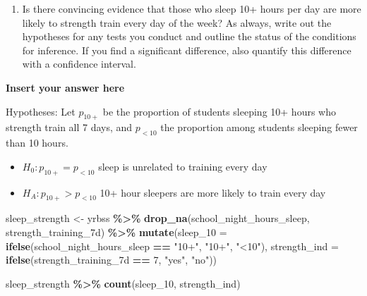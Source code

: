 \documentclass[
]{article}
\newenvironment{Shaded}{\begin{snugshade}}{\end{snugshade}}
\newcommand{\AttributeTok}[1]{\textcolor[rgb]{0.13,0.29,0.53}{#1}}
\newcommand{\DecValTok}[1]{\textcolor[rgb]{0.00,0.00,0.81}{#1}}
\newcommand{\FunctionTok}[1]{\textcolor[rgb]{0.13,0.29,0.53}{\textbf{#1}}}
\newcommand{\NormalTok}[1]{#1}
\newcommand{\OtherTok}[1]{\textcolor[rgb]{0.56,0.35,0.01}{#1}}
\newcommand{\SpecialCharTok}[1]{\textcolor[rgb]{0.81,0.36,0.00}{\textbf{#1}}}
\newcommand{\StringTok}[1]{\textcolor[rgb]{0.31,0.60,0.02}{#1}}
\providecommand{\tightlist}{%
  \setlength{\itemsep}{0pt}\setlength{\parskip}{0pt}}
\begin{document}
\begin{enumerate}
\def\labelenumi{\arabic{enumi}.}
\setcounter{enumi}{8}
\tightlist
\item
  Is there convincing evidence that those who sleep 10+ hours per day
  are more likely to strength train every day of the week? As always,
  write out the hypotheses for any tests you conduct and outline the
  status of the conditions for inference. If you find a significant
  difference, also quantify this difference with a confidence interval.
\end{enumerate}

\textbf{Insert your answer here}

Hypotheses: Let \(p_{10+}\) be the proportion of students sleeping 10+
hours who strength train all 7 days, and \(p_{<10}\) the proportion
among students sleeping fewer than 10 hours.

\begin{itemize}
\tightlist
\item
  \(H_0: p_{10+} = p_{<10}\) sleep is unrelated to training every day
\item
  \(H_A: p_{10+} > p_{<10}\) 10+ hour sleepers are more likely to train
  every day
\end{itemize}

\begin{Shaded}
\begin{Highlighting}[]
\NormalTok{sleep\_strength }\OtherTok{\textless{}{-}}\NormalTok{ yrbss }\SpecialCharTok{\%\textgreater{}\%}
  \FunctionTok{drop\_na}\NormalTok{(school\_night\_hours\_sleep, strength\_training\_7d) }\SpecialCharTok{\%\textgreater{}\%}
  \FunctionTok{mutate}\NormalTok{(}\AttributeTok{sleep\_10 =} \FunctionTok{ifelse}\NormalTok{(school\_night\_hours\_sleep }\SpecialCharTok{==} \StringTok{"10+"}\NormalTok{, }\StringTok{"10+"}\NormalTok{, }\StringTok{"\textless{}10"}\NormalTok{),}
         \AttributeTok{strength\_ind =} \FunctionTok{ifelse}\NormalTok{(strength\_training\_7d }\SpecialCharTok{==} \DecValTok{7}\NormalTok{, }\StringTok{"yes"}\NormalTok{, }\StringTok{"no"}\NormalTok{))}
\end{Highlighting}
\end{Shaded}

\begin{Shaded}
\begin{Highlighting}[]
\NormalTok{sleep\_strength }\SpecialCharTok{\%\textgreater{}\%}
  \FunctionTok{count}\NormalTok{(sleep\_10, strength\_ind)}
\end{Highlighting}
\end{Shaded}
\end{document}
